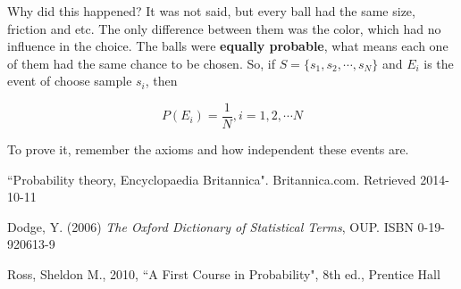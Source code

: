 \documentclass[a4paper,twocolumn]{article}
\begin{document}
Why did this happened? It was not said, but every ball had the same size, friction and etc. The only difference between them was the color, which had no influence in the choice. The balls were \textbf{equally probable}, what means each one of them had the same chance to be chosen. So, if $S = \{s_1, s_2,\dotsm,s_N\}$ and $E_i$ is the event of choose sample $s_i$, then

\begin{equation}
\label{eq:equally_prob}
P(E_i) = \frac{1}{N}, i = 1, 2, \dotsm N
\end{equation}

\noindent To prove it, remember the axioms and how independent these events are.


\begin{thebibliography}{9}
         ``Probability theory, Encyclopaedia Britannica".
         Britannica.com.
         Retrieved 2014-10-11

        Dodge, Y. (2006)
        \textit{The Oxford Dictionary of Statistical Terms}, OUP.
        ISBN 0-19-920613-9

        Ross, Sheldon M.,
        2010,
        ``A First Course in Probability", 8th ed.,
        Prentice Hall
\end{thebibliography}
\end{document}
